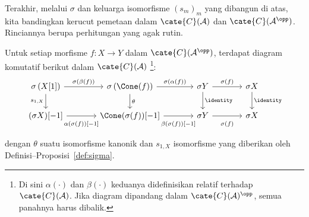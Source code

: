 Terakhir, melalui $\sigma$ dan keluarga isomorfisme $(s_m)_m$ yang dibangun
di atas, kita bandingkan kerucut pemetaan dalam $\cate{C}(\mathcal{A})$ dan
$\cate{C}(\mathcal{A}^{\opp})$. Rinciannya berupa perhitungan yang agak rutin.

\begin{proposisi}\label{prop:sigma-triangulated}
	Untuk setiap morfisme $f:X\to Y$ dalam
	$\cate{C}(\mathcal{A}^{\opp})$, terdapat diagram komutatif berikut dalam
	$\cate{C}(\mathcal{A})$%
	\footnote{Di sini $\alpha(\cdot)$ dan $\beta(\cdot)$ keduanya didefinisikan
	relatif terhadap $\cate{C}(\mathcal{A})$. Jika diagram dipandang dalam
	$\cate{C}(\mathcal{A})^{\opp}$, semua panahnya harus dibalik.}:
	\[\begin{tikzcd}[column sep=large]
		\sigma\left( X{[1]} \right) \arrow[r, "{\sigma(\beta(f))}"] \arrow[d, "{s_{1,X}}"'] & \sigma\left(\Cone(f)\right) \arrow[r, "{\sigma(\alpha(f))}"] \arrow[d, "\theta"] & \sigma Y \arrow[r, "\sigma(f)"] \arrow[d, "\identity"] & \sigma X \arrow[d, "{\identity}"] \\
		(\sigma X){[-1]} \arrow[r, "{\alpha(\sigma(f))[-1]}"' inner sep=0.6em] & \Cone(\sigma(f)){[-1]} \arrow[r, "{\beta(\sigma(f))[-1]}"' inner sep=0.6em] & \sigma Y \arrow[r, "{\sigma(f)}"' inner sep=0.6em] & \sigma X
	\end{tikzcd}\]
	dengan $\theta$ suatu isomorfisme kanonik dan $s_{1,X}$ isomorfisme yang
	diberikan oleh Definisi--Proposisi~\ref{def:sigma}.
\end{proposisi}
